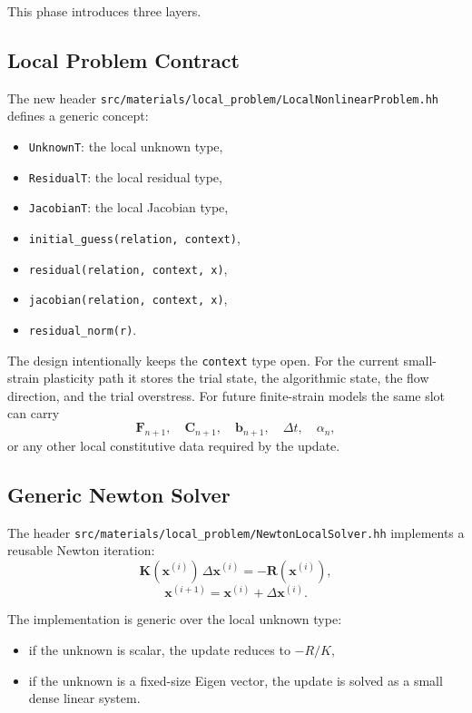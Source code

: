This phase introduces three layers.

\subsection{Local Problem Contract}

The new header
\texttt{src/materials/local\_problem/LocalNonlinearProblem.hh}
defines a generic concept:
\begin{itemize}
  \item \texttt{UnknownT}: the local unknown type,
  \item \texttt{ResidualT}: the local residual type,
  \item \texttt{JacobianT}: the local Jacobian type,
  \item \texttt{initial\_guess(relation, context)},
  \item \texttt{residual(relation, context, x)},
  \item \texttt{jacobian(relation, context, x)},
  \item \texttt{residual\_norm(r)}.
\end{itemize}

The design intentionally keeps the \texttt{context} type open.  For the current
small-strain plasticity path it stores the trial state, the algorithmic state,
the flow direction, and the trial overstress.  For future finite-strain models
the same slot can carry
\[
  \mathbf{F}_{n+1}, \quad \mathbf{C}_{n+1}, \quad \mathbf{b}_{n+1}, \quad
  \Delta t, \quad \alpha_n,
\]
or any other local constitutive data required by the update.

\subsection{Generic Newton Solver}

The header
\texttt{src/materials/local\_problem/NewtonLocalSolver.hh}
implements a reusable Newton iteration:
\[
  \mathbf{K}(\mathbf{x}^{(i)}) \, \Delta \mathbf{x}^{(i)}
  = -\mathbf{R}(\mathbf{x}^{(i)}),
\]
\[
  \mathbf{x}^{(i+1)} = \mathbf{x}^{(i)} + \Delta \mathbf{x}^{(i)}.
\]

The implementation is generic over the local unknown type:
\begin{itemize}
  \item if the unknown is scalar, the update reduces to
        $-\!R/K$,
  \item if the unknown is a fixed-size Eigen vector, the update is solved as a
        small dense linear system.
\end{itemize}

